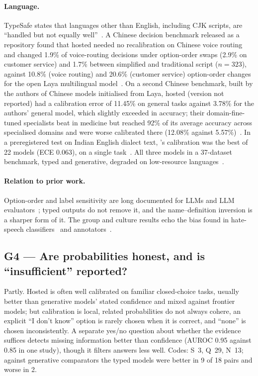 \paragraph{Language.}
TypeSafe states that languages other than English, including CJK scripts, are ``handled but not equally well''~\cite{typesafe_models}.
A Chinese decision benchmark released as a repository found that hosted \jev{} needed no recalibration on Chinese voice routing and changed 1.9\% of voice-routing decisions under option-order swaps (2.9\% on customer service) and 1.7\% between simplified and traditional script ($n = 323$), against 10.8\% (voice routing) and 20.6\% (customer service) option-order changes for the open Laya multilingual model~\cite{qin2026zhdecisionbench}\gmark{}.
On a second Chinese benchmark, built by the authors of Chinese models initialised from Laya, hosted \jev{} (version not reported) had a calibration error of 11.45\% on general tasks against 3.78\% for the authors' general model, which slightly exceeded \jev{} in accuracy; their domain-fine-tuned specialists beat \jev{} in medicine but reached 92\% of its average accuracy across specialised domains and were worse calibrated there (12.08\% against 5.57\%)~\cite{arx36965}.
In a preregistered test on Indian English dialect text, \jev{}'s calibration was the best of 22 models (ECE 0.063), on a single task~\cite{arx24574}. All three models in a 37-dataset benchmark, typed and generative, degraded on low-resource languages~\cite{arx37647}.

\paragraph{Relation to prior work.}
Option-order and label sensitivity are long documented for LLMs and LLM evaluators~\cite{zhao2021calibrate,pezeshkpour2024large,zheng2024large,wang2024fair}; typed outputs do not remove it, and the name--definition inversion is a sharper form of it.
The group and culture results echo the bias found in hate-speech classifiers~\cite{sap2019risk,davidson2019racial} and annotators~\cite{sap2022annotators}.

\subsection{G4 --- Are probabilities honest, and is ``insufficient'' reported?}
\label{sec:g4}

\begin{answerbox}
Partly.
Hosted \jev{} is often well calibrated on familiar closed-choice tasks, usually better than generative models' stated confidence and mixed against frontier models; but calibration is local, related probabilities do not always cohere, an explicit ``I don't know'' option is rarely chosen when it is correct, and ``none'' is chosen inconsistently.
A separate yes/no question about whether the evidence suffices detects missing information better than confidence (AUROC 0.95 against 0.85 in one study), though it filters answers less well.
Codes: S~3, Q~29, N~13; against generative comparators the typed models were better in 9 of 18 pairs and worse in 2.
\end{answerbox}

